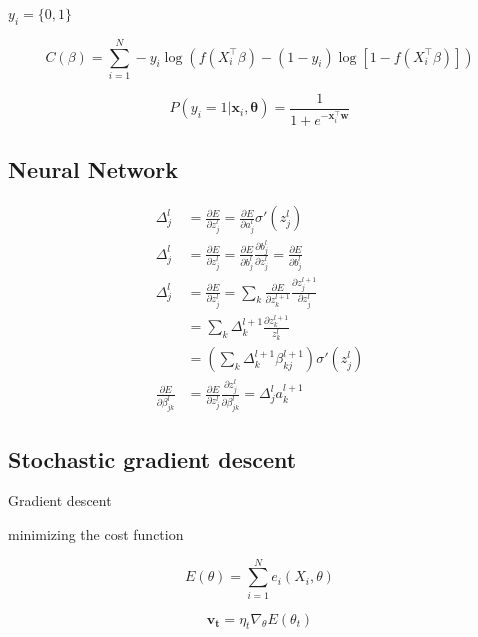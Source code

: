 \documentclass[a4paper,12pt, english]{article}
\begin{document}
$y_i = \{0,1\}$

\begin{equation}
C(\beta) = \sum_{i=1}^N -y_i \log (f(X_i^\top \beta) - (1 - y_i) \log [1 - f(X_i^\top \beta)])
\end{equation}

\begin{equation}
P(y_i = 1|\mathbf{x}_i,\mathbf{\theta}) = \frac{1}{1 + e^{-\mathbf{x}_i^{\top} \mathbf{w}}}
\end{equation}

\subsection{Neural Network}

\begin{align}
\Delta_j^l &= \frac{\partial E}{\partial z_j^l} = \frac{\partial E}{\partial a_j^l} \sigma'(z_j^l) \\
\Delta_j^l &= \frac{\partial E}{\partial z_j^l} = \frac{\partial E}{\partial b_j^l} \frac{\partial b_j^l}{\partial z_j^l} = \frac{\partial E}{\partial b_j^l} \\
\Delta_j^l &= \frac{\partial E}{\partial z_j^l} = \sum_k \frac{\partial E}{\partial z_k^{l+1}} \frac{\partial z_j^{l+1}}{\partial z_j^l} \\
&= \sum_k \Delta_k^{l+1} \frac{\partial z_k^{l+1}}{z_k^l} \\
&= \left( \sum_k \Delta_k^{l+1} \beta_{kj}^{l+1} \right) \sigma'(z_j^l) \\
\frac{\partial E}{\partial \beta_{jk}^l} &= \frac{\partial E}{\partial z_j^l} \frac{\partial z_j^l}{\partial \beta_{jk}^l} = \Delta_j^l a_k^{l+1} 
\end{align}



\subsection{Stochastic gradient descent}

Gradient descent 

minimizing the cost function

\begin{equation}
E(\theta) = \sum_{i=1}^N e_i(X_i, \theta) 
\end{equation}

\begin{equation}
\mathbf{v_t} = \eta_t \nabla_{\theta} E(\theta_t)
\end{equation}
\end{document}
